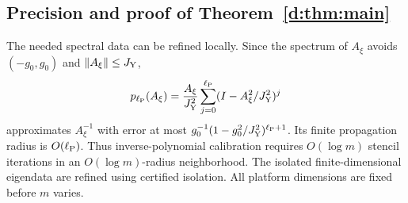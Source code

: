 \subsection{\texorpdfstring{Precision and proof of Theorem~\ref{d:thm:main}}{Precision and proof of the Yee realization theorem}}

The needed spectral data can be refined locally. Since the spectrum of $A_\xi$ avoids $(-g_0,g_0)$ and $\left\lVert A_\xi\right\rVert\le J_{\rm Y}$,
\begin{equation}\label{d:eq:inverse-polynomial}
 p_{\ell_{\rm P}}(A_\xi)=\frac {A_\xi}{J_{\rm Y}^2}\sum_{j=0}^{\ell_{\rm P}}(I-A_\xi^2/J_{\rm Y}^2)^j
\end{equation}
approximates $A_\xi^{-1}$ with error at most
$g_0^{-1}(1-g_0^2/J_{\rm Y}^2)^{\ell_{\rm P}+1}$. Its finite propagation radius is $O(\ell_{\rm P})$. Thus inverse-polynomial calibration requires $O(\log m)$ stencil iterations in an $O(\log m)$-radius neighborhood. The isolated finite-dimensional eigendata are refined using certified isolation. All platform dimensions are fixed before $m$ varies.

